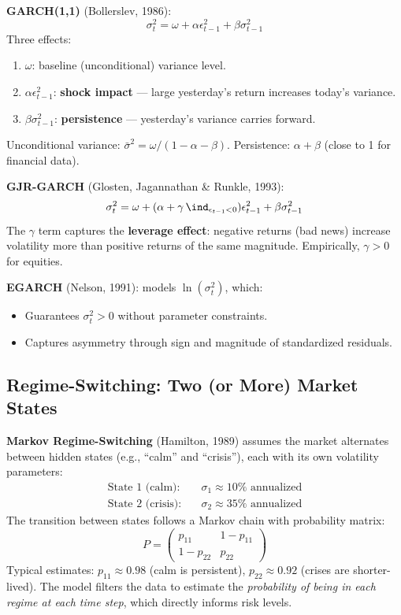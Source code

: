\documentclass[11pt, a4paper]{article}
\begin{document}
\begin{keyidea}
\textbf{GARCH(1,1)} (Bollerslev, 1986):
\[
    \sigma_t^2 = \omega + \alpha \epsilon_{t-1}^2 + \beta \sigma_{t-1}^2
\]
Three effects:
\begin{enumerate}
    \item $\omega$: baseline (unconditional) variance level.
    \item $\alpha \epsilon_{t-1}^2$: \textbf{shock impact} --- large yesterday's return increases today's variance.
    \item $\beta \sigma_{t-1}^2$: \textbf{persistence} --- yesterday's variance carries forward.
\end{enumerate}
Unconditional variance: $\bar\sigma^2 = \omega / (1 - \alpha - \beta)$.
Persistence: $\alpha + \beta$ (close to 1 for financial data).

\medskip

\textbf{GJR-GARCH} (Glosten, Jagannathan \& Runkle, 1993):
\[
    \sigma_t^2 = \omega + (\alpha + \gamma \, \ind_{\epsilon_{t-1} < 0}) \epsilon_{t-1}^2 + \beta \sigma_{t-1}^2
\]
The $\gamma$ term captures the \textbf{leverage effect}: negative returns (bad news) increase volatility more than positive returns of the same magnitude.
Empirically, $\gamma > 0$ for equities.

\medskip

\textbf{EGARCH} (Nelson, 1991): models $\ln(\sigma_t^2)$, which:
\begin{itemize}
    \item Guarantees $\sigma_t^2 > 0$ without parameter constraints.
    \item Captures asymmetry through sign and magnitude of standardized residuals.
\end{itemize}
\end{keyidea}

\subsection{Regime-Switching: Two (or More) Market States}

\begin{keyidea}
\textbf{Markov Regime-Switching} (Hamilton, 1989) assumes the market alternates between hidden states (e.g., ``calm'' and ``crisis''), each with its own volatility parameters:
\begin{align*}
    \text{State 1 (calm)}: &\quad \sigma_1 \approx 10\% \text{ annualized} \\
    \text{State 2 (crisis)}: &\quad \sigma_2 \approx 35\% \text{ annualized}
\end{align*}
The transition between states follows a Markov chain with probability matrix:
\[
    P = \begin{pmatrix} p_{11} & 1 - p_{11} \\ 1 - p_{22} & p_{22} \end{pmatrix}
\]
Typical estimates: $p_{11} \approx 0.98$ (calm is persistent), $p_{22} \approx 0.92$ (crises are shorter-lived).
The model filters the data to estimate the \emph{probability of being in each regime at each time step}, which directly informs risk levels.
\end{keyidea}
\end{document}
